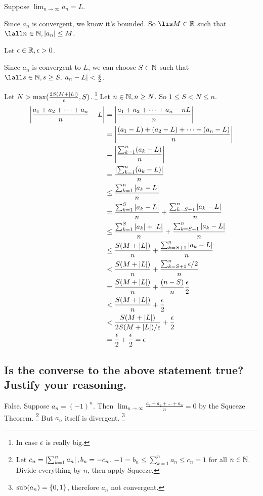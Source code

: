 \documentclass[10pt, letterpaper, titlepage]{article}
\newcommand\limntoinfty{\lim_{n \to \infty}}
\begin{document}
        Suppose $\limntoinfty a_n = L$.

        Since $a_n$ is convergent, we know it's bounded. %
        So $\lis M \in \R$ such that $\lall n \in \N, \abs{a_n} \leq M$.
        
        Let $\epsilon\in\mathbb{R}, \epsilon > 0$.

        Since $a_n$ is convergent to $L$,
        we can choose $S \in \mathbb{N}$ such that $\lall s \in \N, s \geq S, \abs{a_n - L} < \frac{\e}{2}$.

        Let $N > \max(\frac{2S(M +\left|L\right|)}{\epsilon}, S)$.
        \footnote{In case $\epsilon$ is really big.}
        Let $n \in \mathbb{N}, n \geq N$.
        So $1 \leq S < N \leq n$.
        \begin{align*}
          \left|\frac{a_1 + a_2 + \dots + a_n}{n} - L\right|
          &= \left|\frac{a_1 + a_2 + \dots + a_n - nL}{n}\right| \\ 
          &= \left|\frac{(a_1 - L) + (a_2 - L) + \dots + (a_n - L)}{n}\right| \\ 
          &= \left|\frac{\sum_{k=1}^n(a_k - L)}{n}\right| \\ 
          &= \frac{\left|\sum_{k=1}^n(a_k - L)\right|}{n} \\ 
          &\leq \frac{\sum_{k=1}^n\left|a_k - L\right|}{n} \\ 
          &= \frac{\sum_{k=1}^S\left|a_k - L\right|}{n} + \frac{\sum_{k=S+1}^n\left|a_k - L\right|}{n} \\ 
          &\leq \frac{\sum_{k=1}^S\left|a_k\right| + \left|L\right|}{n} + \frac{\sum_{k=S+1}^n\left|a_k - L\right|}{n} \\ 
          &\leq \frac{S(M + \left|L\right|)}{n} + \frac{\sum_{k=S+1}^n\left|a_k - L\right|}{n} \\ 
          &< \frac{S(M + \left|L\right|)}{n} + \frac{\sum_{k=S+1}^n \epsilon/2}{n} \\ 
          &= \frac{S(M + \left|L\right|)}{n} + \frac{(n - S)}{n}\frac{\epsilon}{2} \\ 
          &< \frac{S(M + \left|L\right|)}{n} + \frac{\epsilon}{2} \\ 
          &< \frac{S(M + \left|L\right|)}{2S(M +\left|L\right|)/\epsilon} + \frac{\epsilon}{2} \\ 
          &= \frac{\epsilon}{2}+ \frac{\epsilon}{2} = \epsilon
        \end{align*}

      \subsection{Is the converse to the above statement true? Justify your reasoning.}
      False.
      Suppose $a_n = (-1)^n$.
      Then $\limntoinfty \frac{a_1 + a_2 + \dots + a_n}{n} = 0$ by the Squeeze Theorem.
      \footnote{Let $c_n = \left|\sum_{k=1}^n a_n\right|, b_n = - c_n$.
        $-1 = b_n \leq \sum_{k=1}^n a_n \leq c_n = 1$ for all $n \in \mathbb{N}$. 
        Divide everything by $n$, then apply Squeeze.}
      But $a_n$ itself is divergent.
      \footnote{$\textrm{sub}(a_n) = \{ 0,1 \}$, therefore $a_n$ not convergent.}
\end{document}
